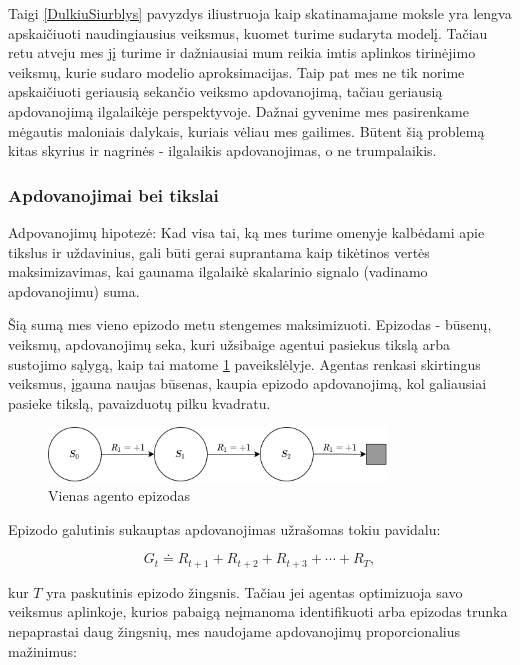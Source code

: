 \documentclass[a4paper, 12pt]{article}
\begin{document}
Taigi \ref{DulkiuSiurblys} pavyzdys iliustruoja kaip skatinamajame moksle yra lengva apskaičiuoti naudingiausius veiksmus, kuomet turime sudaryta modelį. Tačiau retu atveju mes jį turime ir dažniausiai mum reikia imtis aplinkos tirinėjimo veiksmų, kurie sudaro modelio aproksimacijas. Taip pat mes ne tik norime apskaičiuoti geriausią sekančio veiksmo apdovanojimą, tačiau geriausią apdovanojimą ilgalaikėje perspektyvoje. Dažnai gyvenime mes pasirenkame mėgautis maloniais dalykais, kuriais vėliau mes gailimes. Būtent šią problemą kitas skyrius ir nagrinės - ilgalaikis apdovanojimas, o ne trumpalaikis.

\subsubsection{Apdovanojimai bei tikslai}

Adpovanojimų hipotezė: Kad visa tai, ką mes turime omenyje kalbėdami apie tikslus ir uždavinius, gali būti gerai suprantama kaip tikėtinos vertės maksimizavimas, kai gaunama ilgalaikė skalarinio signalo (vadinamo apdovanojimu) suma.

Šią sumą mes vieno epizodo metu stengemes maksimizuoti. Epizodas - būsenų, veiksmų, apdovanojimų seka, kuri užsibaige agentui pasiekus tikslą arba sustojimo sąlygą, kaip tai matome \ref{Episodas} paveikslėlyje. Agentas renkasi skirtingus veiksmus, įgauna naujas būsenas, kaupia epizodo apdovanojimą, kol galiausiai pasieke tikslą, pavaizduotų pilku kvadratu.

\begin{figure}[h]
\centering
\includegraphics[width=0.8\textwidth]{Episodas}
\caption{Vienas agento epizodas}
\label{Episodas}
\end{figure}

Epizodo galutinis sukauptas apdovanojimas užrašomas tokiu pavidalu:

\begin{equation}
G_{t} \doteq R_{t+1}+R_{t+2}+R_{t+3}+\cdots+R_{T},
\end{equation}

kur $T$ yra paskutinis epizodo žingsnis. Tačiau jei agentas optimizuoja savo veiksmus aplinkoje, kurios pabaigą neįmanoma identifikuoti arba epizodas trunka nepaprastai daug žingsnių, mes naudojame apdovanojimų proporcionalius mažinimus:
\end{document}
